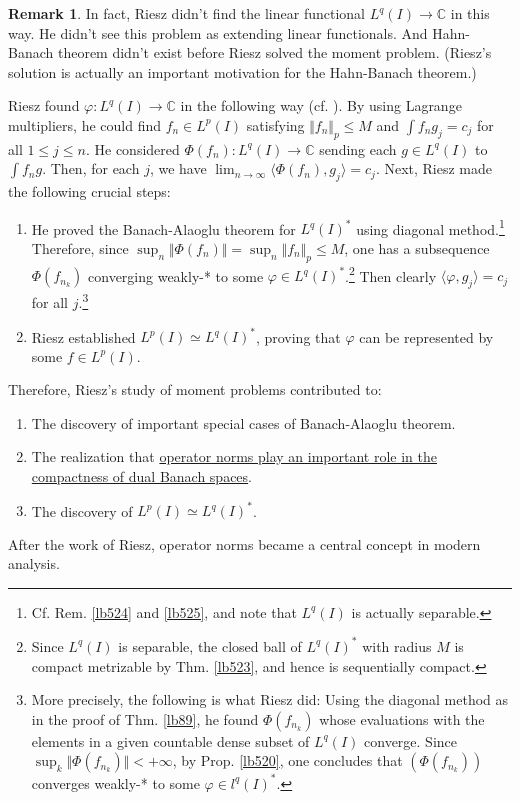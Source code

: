 \documentclass[12pt,b5paper,notitlepage]{article}
\theoremstyle{definition}
\newtheorem{rem}[df]{Remark}
\theoremstyle{plain}
\newcommand{\bk}[1]{\langle {#1}\rangle}
\newcommand{\Cbb}{\mathbb C}
\numberwithin{equation}{section}
\begin{document}
\begin{rem}\label{lb526}
In fact, Riesz didn't find the linear functional $L^q(I)\rightarrow\Cbb$ in this way. He didn't see this problem as extending linear functionals. And Hahn-Banach theorem didn't exist before Riesz solved the moment problem. (Riesz's solution is actually an important motivation for the Hahn-Banach theorem.)

Riesz found $\varphi:L^q(I)\rightarrow\Cbb$ in the following way (cf. \cite[Sec. VI.2]{Die-H}). By using Lagrange multipliers, he could find $f_n\in L^p(I)$ satisfying $\Vert f_n\Vert_p\leq M$ and $\int f_ng_j=c_j$ for all $1\leq j\leq n$. He considered $\Phi(f_n):L^q(I)\rightarrow\Cbb$ sending each $g\in L^q(I)$ to $\int f_ng$. Then, for each $j$, we have $\lim_{n\rightarrow\infty}\bk{\Phi(f_n),g_j}=c_j$. Next, Riesz made the following crucial steps:
\begin{enumerate}[label=(\arabic*)]
\item He proved the Banach-Alaoglu theorem for $L^q(I)^*$ using diagonal method.\footnote{Cf. Rem. \ref{lb524} and \ref{lb525}, and note that $L^q(I)$ is actually separable.} Therefore, since $\sup_n \Vert\Phi(f_n)\Vert=\sup_n\Vert f_n\Vert_p\leq M$, one has a subsequence $\Phi(f_{n_k})$  converging weakly-* to some $\varphi\in L^q(I)^*$.\footnote{Since $L^q(I)$ is separable, the closed ball of $L^q(I)^*$ with radius $M$ is compact metrizable by Thm. \ref{lb523}, and hence is sequentially compact.}  Then clearly $\bk{\varphi,g_j}=c_j$ for all $j$.\footnote{More precisely, the following is what Riesz did: Using the diagonal method as in the proof of Thm. \ref{lb89}, he found $\Phi(f_{n_k})$ whose evaluations with the elements in a given countable dense subset of $L^q(I)$ converge. Since $\sup_k\Vert\Phi(f_{n_k})\Vert<+\infty$, by Prop. \ref{lb520}, one concludes that $(\Phi(f_{n_k}))$ converges weakly-* to some $\varphi\in l^q(I)^*$.}
\item Riesz established $L^p(I)\simeq L^q(I)^*$, proving that $\varphi$ can be represented by some $f\in L^p(I)$.
\end{enumerate}
Therefore, Riesz's study of moment problems contributed to:
\begin{enumerate}[label=(\alph*)]
\item The discovery of important special cases of Banach-Alaoglu theorem.
\item The realization that \uline{operator norms play an important role in the compactness of dual Banach spaces}.
\item The discovery of $L^p(I)\simeq L^q(I)^*$.
\end{enumerate}
After the work of Riesz, operator norms became a central concept in modern analysis.  \hfill\qedsymbol
\end{rem}
\end{document}
